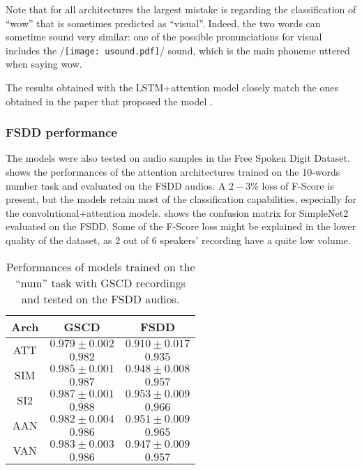 Note that for all architectures the largest mistake is regarding the
classification of ``wow'' that is sometimes predicted as ``visual''. Indeed,
the two words can sometime sound very similar: one of the possible
pronunciations for visual includes the 
/\texttt{[image: usound.pdf]}/ sound, which is the main phoneme
uttered when saying wow.

The results obtained with the LSTM+attention model closely match the ones
obtained in the paper that proposed the model \cite{2018arXiv180808929C}.

\subsubsection{FSDD performance}

The models were also tested on audio samples in the Free Spoken Digit Dataset.
 shows the performances of the attention
architectures trained on the 10-words number task and evaluated on the FSDD
audios.
%
A $2-3\%$ loss of F-Score is present, but the models retain most of the
classification capabilities, especially for the convolutional+attention models.
%
 shows the
confusion matrix for SimpleNet2 evaluated on the FSDD.
%
Some of the F-Score loss might be explained in the lower quality of the
dataset, as $2$ out of $6$ speakers' recording have a quite low volume.

\begin{table}[h!]
    \centering
    \caption{Performances of models trained on the ``num'' task with GSCD
        recordings and tested on the FSDD audios.
    }
    \label{tab:fsdd_performance}
    \begin{tabular}{|c|cc|}
        \hline
        Arch & GSCD & FSDD \\
        \hline
        \multirow{2}{*}{ATT}
            & $0.979 \pm 0.002$    & $0.910 \pm 0.017$ \\
            & $0.982$              & $0.935$ \\
        \hline
        \multirow{2}{*}{SIM}
            & $0.985 \pm 0.001$    & $0.948 \pm 0.008$ \\
            & $0.987$              & $0.957$ \\
        \multirow{2}{*}{SI2}
            & $0.987 \pm 0.001$    & $0.953 \pm 0.009$ \\
            & $0.988$              & $0.966$ \\
        \multirow{2}{*}{AAN}
            & $0.982 \pm 0.004$    & $0.951 \pm 0.009$ \\
            & $0.986$              & $0.965$ \\
        \multirow{2}{*}{VAN}
            & $0.983 \pm 0.003$    & $0.947 \pm 0.009$ \\
            & $0.986$              & $0.957$ \\
        \hline
    \end{tabular}
\end{table}

